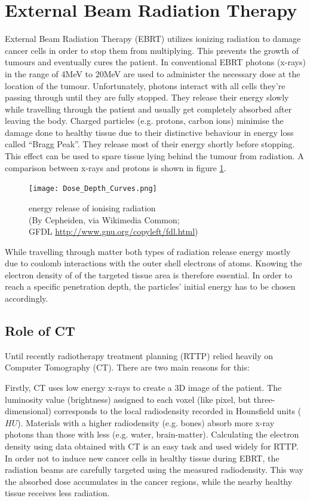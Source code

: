 \section{External Beam Radiation Therapy}
\label{sec:planning}
External Beam Radiation Therapy (EBRT) utilizes ionizing radiation to damage cancer cells in order to stop them from multiplying.
This prevents the growth of tumours and eventually cures the patient. 
In conventional EBRT photons (x-rays) in the range of 4MeV to 20MeV are used to administer the necessary dose at the location of the tumour. Unfortunately, photons interact with all cells
they're passing through until they are fully stopped. They release their energy slowly while travelling through the patient and usually get completely absorbed after leaving the body.
Charged particles (e.g. protons, carbon ions) minimise the damage done to healthy tissue due to their distinctive behaviour in energy loss called ``Bragg Peak''.
They release most of their energy shortly before stopping. \cite{Nakamura2010} This effect can be used to spare tissue lying behind the tumour from radiation. \cite{Paganetti2005} %
A comparison between x-rays and protons is shown in figure \ref{fig:bragg}.

\begin{figure}[!h]
	\centering
	\texttt{[image: Dose\_Depth\_Curves.png]}
	\caption{energy release of ionising radiation \\(By Cepheiden, via Wikimedia Common;\\ GFDL \url{http://www.gnu.org/copyleft/fdl.html})}
	\label{fig:bragg}
\end{figure}

While travelling through matter both types of radiation release energy mostly due to coulomb interactions with the outer shell electrons of atoms.
Knowing the electron density of of the targeted tissue area is therefore essential. In order to reach a specific penetration depth, the particles' initial energy has to be chosen accordingly.

\clearpage
\subsection{Role of CT}

Until recently radiotherapy treatment planning (RTTP) relied heavily on Computer Tomography (CT). There are two main reasons for this:

Firstly, CT uses low energy x-rays to create a 3D image of the patient. The luminosity value (brightness) assigned to each voxel (like pixel, but three-dimensional) corresponds to
the local radiodensity recorded in Hounsfield units ($HU$). Materials with a higher radiodensity (e.g. bones) absorb more x-ray photons than those with less (e.g. water, brain-matter).
Calculating the electron density using data obtained with CT is an easy task and used widely for RTTP. \cite{Constantinou2012, Schneider1996}
In order not to induce new cancer cells in healthy tissue during EBRT, the radiation beams are carefully targeted using the measured radiodensity. 
This way the absorbed dose accumulates in the cancer regions, while the nearby healthy tissue receives less radiation.

